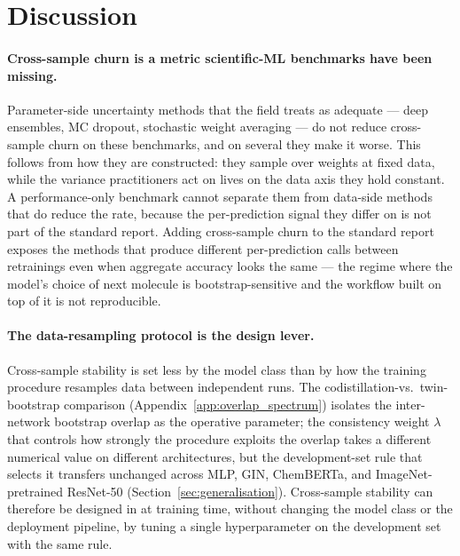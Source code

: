 \section{Discussion}
\label{sec:discussion}

\paragraph{Cross-sample churn is a metric scientific-ML benchmarks have been missing.}
Parameter-side uncertainty methods that the field treats as adequate
--- deep ensembles, MC dropout, stochastic weight averaging ---
do not reduce cross-sample churn on these benchmarks, and on several
they make it worse.  This follows from how they are constructed:
they sample over weights at fixed data, while the variance
practitioners act on lives on the data axis they hold constant.  A
performance-only benchmark cannot separate them from data-side
methods that do reduce the rate, because the per-prediction signal
they differ on is not part of the standard report.  Adding
cross-sample churn to the standard report exposes the methods that
produce different per-prediction calls between retrainings even when
aggregate accuracy looks the same --- the regime where the model's
choice of next molecule is bootstrap-sensitive and the workflow
built on top of it is not reproducible.

\paragraph{The data-resampling protocol is the design lever.}
Cross-sample stability is set less by the model class than by how
the training procedure resamples data between independent runs.  The
codistillation-vs.\ twin-bootstrap comparison
(Appendix~\ref{app:overlap_spectrum}) isolates the inter-network
bootstrap overlap as the operative parameter; the consistency weight
$\lambda$ that controls how strongly the procedure exploits the
overlap takes a different numerical value on different
architectures, but the development-set rule that selects it
transfers unchanged across MLP, GIN, ChemBERTa, and ImageNet-pretrained
ResNet-50 (Section~\ref{sec:generalisation}).  Cross-sample stability
can therefore be designed in at training time, without changing the
model class or the deployment pipeline, by tuning a single
hyperparameter on the development set with the same rule.


